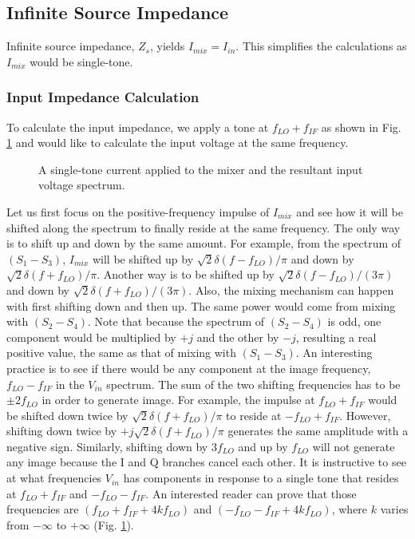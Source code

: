 \subsection{Infinite Source Impedance}
Infinite source impedance, $Z_s$, yields $I_{mix}=I_{in}$. This simplifies the calculations as $I_{mix}$ would be single-tone.
\subsubsection{Input Impedance Calculation} 
To calculate the input impedance, we apply a tone at $f_{LO}+f_{IF}$ as shown in Fig. \ref{spectrumzmix} and would like to calculate the input voltage
at the same frequency. 
\begin{figure}[htb]
\vspace{1.9in}
\caption{A single-tone current applied to the mixer and the resultant input voltage spectrum.}
\label{spectrumzmix}
\end{figure}
Let us first focus on the positive-frequency impulse of
$I_{mix}$ and see how it will be shifted along the spectrum to finally reside at the same frequency. The only way is to shift up and down by the
same amount. For example, from the spectrum of $(S_1-S_3)$, $I_{mix}$ will be shifted up by $\sqrt 2 \delta (f-f_{LO})/\pi$ and down by  $\sqrt 2
\delta (f+f_{LO})/\pi$. Another way is to be shifted up by $\sqrt 2 \delta (f-f_{LO})/(3\pi)$ and down by $\sqrt 2 \delta (f+f_{LO})/(3\pi)$.
Also, the mixing mechanism can happen with first shifting down and then up. The same power would come from mixing with $(S_2-S_4)$. Note that
because the spectrum of $(S_2-S_4)$ is odd, one component would be multiplied by $+j$ and the other by $-j$, resulting a real positive value, the
same as that of mixing with $(S_1-S_3)$.
An interesting practice is to see if there would be any component at the image frequency, $f_{LO}-f_{IF}$ in the $V_{in}$ spectrum. The sum of the
two shifting frequencies has to be $\pm 2 f_{LO}$ in order to generate image. For example, the impulse at $f_{LO}+f_{IF}$ would be shifted down twice by
$\sqrt 2 \delta (f+f_{LO})/\pi$ to reside at $-f_{LO}+f_{IF}$. However, shifting down twice by  $+j \sqrt 2 \delta (f+f_{LO})/\pi$ generates the
same amplitude with a negative sign. Similarly, shifting down by $3 f_{LO}$ and up by $f_{LO}$ will not generate any image because the I and Q
branches cancel each other. It is instructive to see at what frequencies $V_{in}$ has components in response to a single tone that resides at
$f_{LO}+f_{IF}$ and $-f_{LO}-f_{IF}$. An interested reader can prove that those frequencies are $(f_{LO}+f_{IF}+4kf_{LO})$ and
$(-f_{LO}-f_{IF}+4kf_{LO})$, where $k$ varies from $-\infty$ to $+\infty$ (Fig. \ref{spectrumzmix}).

